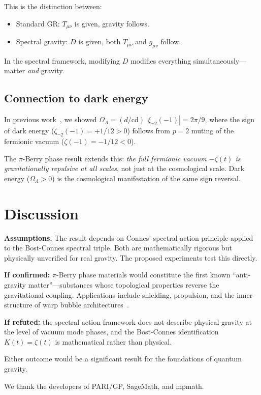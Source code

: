 \documentclass[aps,prl,twocolumn,superscriptaddress,nofootinbib]{revtex4-2}
\begin{document}
This is the distinction between:
\begin{itemize}
\item Standard GR: $T_{\mu\nu}$ is given, gravity follows.
\item Spectral gravity: $D$ is given, both $T_{\mu\nu}$ and $g_{\mu\nu}$ follow.
\end{itemize}

In the spectral framework, modifying $D$ modifies everything
simultaneously---matter \emph{and} gravity.

\subsection{Connection to dark energy}

In previous work~\cite{WB_arithmetic_universe}, we showed
$\Omega_\Lambda = (d/\mathrm{cd})\,|\xi_{\neg 2}(-1)| = 2\pi/9$,
where the sign of dark energy ($\zeta_{\neg 2}(-1) = +1/12 > 0$)
follows from $p = 2$ muting of the fermionic vacuum
($\zeta(-1) = -1/12 < 0$).

The $\pi$-Berry phase result extends this:
\emph{the full fermionic vacuum $-\zeta(t)$
is gravitationally repulsive at all scales},
not just at the cosmological scale.
Dark energy ($\Omega_\Lambda > 0$) is the cosmological
manifestation of the same sign reversal.

\section{Discussion}

\textbf{Assumptions.}
The result depends on Connes' spectral action principle
applied to the Bost-Connes spectral triple.
Both are mathematically rigorous but physically unverified
for real gravity.
The proposed experiments test this directly.

\textbf{If confirmed:}
$\pi$-Berry phase materials would constitute the first known
``anti-gravity matter''---substances whose topological properties
reverse the gravitational coupling.
Applications include shielding, propulsion, and the inner
structure of warp bubble architectures~\cite{WB_spectral_warp}.

\textbf{If refuted:}
the spectral action framework does not describe physical
gravity at the level of vacuum mode phases, and the
Bost-Connes identification $K(t) = \zeta(t)$ is
mathematical rather than physical.

Either outcome would be a significant result for
the foundations of quantum gravity.

\begin{acknowledgments}
We thank the developers of PARI/GP, SageMath, and mpmath.
\end{acknowledgments}
\end{document}
